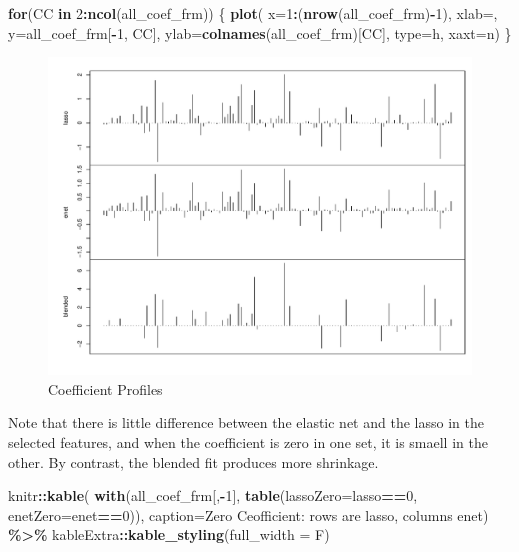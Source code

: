 \documentclass[
]{book}
\newenvironment{Shaded}{\begin{snugshade}}{\end{snugshade}}
\newcommand{\ControlFlowTok}[1]{\textcolor[rgb]{0.13,0.29,0.53}{\textbf{#1}}}
\newcommand{\DataTypeTok}[1]{\textcolor[rgb]{0.13,0.29,0.53}{#1}}
\newcommand{\DecValTok}[1]{\textcolor[rgb]{0.00,0.00,0.81}{#1}}
\newcommand{\KeywordTok}[1]{\textcolor[rgb]{0.13,0.29,0.53}{\textbf{#1}}}
\newcommand{\NormalTok}[1]{#1}
\newcommand{\OperatorTok}[1]{\textcolor[rgb]{0.81,0.36,0.00}{\textbf{#1}}}
\newcommand{\StringTok}[1]{\textcolor[rgb]{0.31,0.60,0.02}{#1}}
\begin{document}
\begin{Shaded}
\begin{Highlighting}[]
\ControlFlowTok{for}\NormalTok{(CC }\ControlFlowTok{in} \DecValTok{2}\OperatorTok{:}\KeywordTok{ncol}\NormalTok{(all\_coef\_frm)) \{}
 \KeywordTok{plot}\NormalTok{(}
  \DataTypeTok{x=}\DecValTok{1}\OperatorTok{:}\NormalTok{(}\KeywordTok{nrow}\NormalTok{(all\_coef\_frm)}\OperatorTok{{-}}\DecValTok{1}\NormalTok{), }\DataTypeTok{xlab=}\StringTok{\textquotesingle{}\textquotesingle{}}\NormalTok{, }
  \DataTypeTok{y=}\NormalTok{all\_coef\_frm[}\OperatorTok{{-}}\DecValTok{1}\NormalTok{, CC], }\DataTypeTok{ylab=}\KeywordTok{colnames}\NormalTok{(all\_coef\_frm)[CC],}
  \DataTypeTok{type=}\StringTok{\textquotesingle{}h\textquotesingle{}}\NormalTok{, }\DataTypeTok{xaxt=}\StringTok{\textquotesingle{}n\textquotesingle{}}\NormalTok{)}
\NormalTok{\}}
\end{Highlighting}
\end{Shaded}

\begin{figure}
\centering
\includegraphics{Static/figures/compCoeffProf-1.pdf}
\caption{\label{fig:compCoeffProf}Coefficient Profiles}
\end{figure}

Note that there is little difference between the elastic net and the lasso
in the selected features, and when the coefficient is zero in one set, it
is smaell in the other. By contrast, the blended fit produces more shrinkage.

\begin{Shaded}
\begin{Highlighting}[]
\NormalTok{knitr}\OperatorTok{::}\KeywordTok{kable}\NormalTok{(}
\KeywordTok{with}\NormalTok{(all\_coef\_frm[,}\OperatorTok{{-}}\DecValTok{1}\NormalTok{], }\KeywordTok{table}\NormalTok{(}\DataTypeTok{lassoZero=}\NormalTok{lasso}\OperatorTok{==}\DecValTok{0}\NormalTok{, }\DataTypeTok{enetZero=}\NormalTok{enet}\OperatorTok{==}\DecValTok{0}\NormalTok{)),}
 \DataTypeTok{caption=}\StringTok{\textquotesingle{}Zero Ceofficient: rows are lasso, columns enet\textquotesingle{}}\NormalTok{) }\OperatorTok{\%>\%}
\StringTok{  }\NormalTok{kableExtra}\OperatorTok{::}\KeywordTok{kable\_styling}\NormalTok{(}\DataTypeTok{full\_width =}\NormalTok{ F)}
\end{Highlighting}
\end{Shaded}
\end{document}
